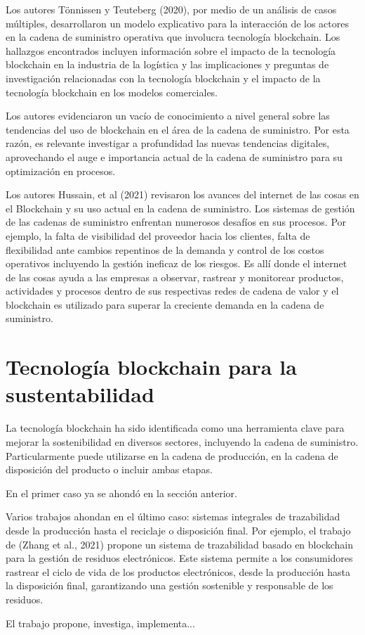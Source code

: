 \documentclass[main.tex]{subfiles}
\begin{document}
Los autores Tönnissen y Teuteberg (2020), por medio de un análisis de casos múltiples,
desarrollaron un modelo explicativo para la interacción de los actores en la cadena de suministro
operativa que involucra tecnología blockchain. Los hallazgos encontrados incluyen información
sobre el impacto de la tecnología blockchain en la industria de la logística y las implicaciones y
preguntas de investigación relacionadas con la tecnología blockchain y el impacto de la tecnología
blockchain en los modelos comerciales.

Los autores evidenciaron un vacío de conocimiento a nivel general sobre las tendencias del uso de blockchain en el área de la cadena de suministro. Por esta razón, es relevante investigar a profundidad las nuevas tendencias digitales, aprovechando el auge e importancia actual de la cadena de suministro para su optimización en procesos. \cite{torres2022tendencias}

Los autores Hussain, et al (2021) revisaron los avances del internet de las cosas en el
Blockchain y su uso actual en la cadena de suministro. Los sistemas de gestión de las cadenas de
suministro enfrentan numerosos desafíos en sus procesos. Por ejemplo, la falta de visibilidad del
proveedor hacia los clientes, falta de flexibilidad ante cambios repentinos de la demanda y control
de los costos operativos incluyendo la gestión ineficaz de los riesgos. Es allí donde el internet de
las cosas ayuda a las empresas a observar, rastrear y monitorear productos, actividades y procesos
dentro de sus respectivas redes de cadena de valor y el blockchain es utilizado para superar la
creciente demanda en la cadena de suministro.

\section{Tecnología blockchain para la sustentabilidad}

La tecnología blockchain ha sido identificada como una herramienta clave para mejorar la sostenibilidad en diversos sectores, incluyendo la cadena de suministro. Particularmente puede utilizarse en la cadena de producción, en la cadena de disposición del producto o incluir ambas etapas.

En el primer caso ya se ahondó en la sección anterior.

Varios trabajos ahondan en el último caso: sistemas integrales de trazabilidad desde la producción hasta el reciclaje o disposición final. Por ejemplo, el trabajo de (Zhang et al., 2021) propone un sistema de trazabilidad basado en blockchain para la gestión de residuos electrónicos. Este sistema permite a los consumidores rastrear el ciclo de vida de los productos electrónicos, desde la producción hasta la disposición final, garantizando una gestión sostenible y responsable de los residuos.

El trabajo \cite{baralla2023waste, bulkowska2023implementation, alnuaimi2023blockchain, castiglione2023framework, alnuaimi2023blockchain, BISWAS2023128} propone, investiga, implementa...
\end{document}
